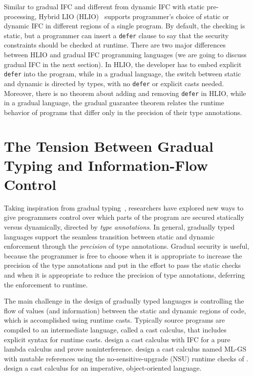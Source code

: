 \documentclass[10pt, letterpaper]{article}
\begin{document}
Similar to gradual IFC and different from dynamic IFC with static
pre-processing, Hybrid LIO (HLIO)~\cite{Buiras:2015aa} supports programmer's
choice of static or dynamic IFC in different regions of a single program. By
default, the checking is static, but a programmer can insert a \texttt{defer}
clause to say that the security constraints should be checked at runtime. There
are two major differences between HLIO and gradual IFC programming languages (we
are going to discuss gradual IFC in the next section). In HLIO, the developer
has to embed explicit \texttt{defer} into the program, while in a gradual
language, the switch between static and dynamic is directed by types, with no
\texttt{defer} or explicit casts needed. Moreover, there is no theorem about
adding and removing \texttt{defer} in HLIO, while in a gradual language, the
gradual guarantee theorem relates the runtime behavior of programs that differ
only in the precision of their type annotations.

\section{The Tension Between Gradual Typing and Information-Flow Control}
\label{sec:intro-gradual-ifc}

Taking inspiration from gradual typing~\citep{Siek:2006bh,Siek:2007qy},
researchers have explored new ways to give programmers control over which parts
of the program are secured statically versus dynamically, directed by
\textit{type annotations}. In general, gradually typed languages support the
seamless transition between static and dynamic enforcement through the
\textit{precision} of type annotations. Gradual security is useful, because the
programmer is free to choose when it is appropriate to increase the precision of
the type annotations and put in the effort to pass the static checks and when it
is appropriate to reduce the precision of type annotations, deferring the
enforcement to runtime.

The main challenge in the design of gradually typed languages is controlling the
flow of values (and information) between the static and dynamic regions of code,
which is accomplished using runtime casts. Typically source programs are
compiled to an intermediate language, called a cast calculus, that includes
explicit syntax for runtime casts. \citet{Disney:2011fv} design a cast
calculus with IFC for a pure lambda calculus and prove noninterference.
\citet{Fennell:2013ab} design a cast calculus named ML-GS with mutable
references using the no-sensitive-upgrade (NSU) runtime checks of
\citet{austin2009efficient}. \citet{Fennell:2015aa} design a cast calculus
for an imperative, object-oriented language.
\end{document}
